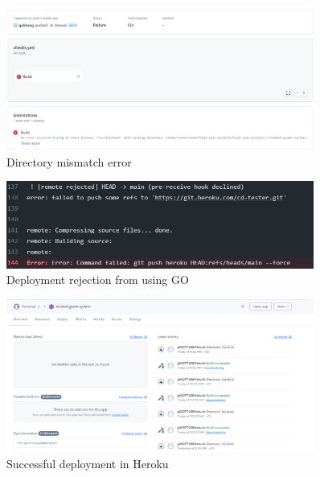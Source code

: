 \begin{figure}[h!]
    \centering
    \includegraphics[width=0.9\textwidth]{images/build-fail-directory.png}
    \caption{Directory mismatch error}
    \label{image:build-fail-directory.png}
\end{figure}

\begin{figure}[h!]
    \centering
    \includegraphics[width=0.9\textwidth]{images/heroku-go-issue.png}
    \caption{Deployment rejection from using GO}
    \label{image:heroku-go-issue.png}
\end{figure}

\begin{figure}[h!]
    \centering
    \includegraphics[width=0.9\textwidth]{images/heroku-success.png}
    \caption{Successful deployment in Heroku}
    \label{image:heroku-success.png}
\end{figure}